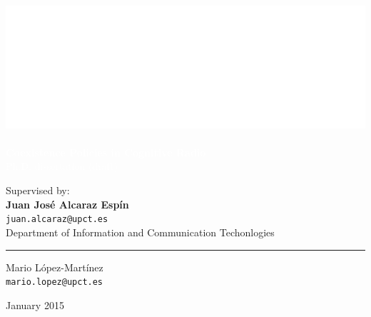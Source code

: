 \graphicspath{ {img/} }

\makeatletter                   
\def\printauthor{%
    {\large \@author}}          
\makeatother

\author{%

    }
\begin{titlingpage}
\BgThispage
{}
\vspace*{0.25\textheight}
\noindent
\includegraphics{logo.eps}\\\\ 
\textcolor{white}{\Huge\textbf{{Coexistence Policies in Cognitive Radio}}}\vspace*{0.25cm}\\
\noindent
\hspace*{1cm}\textcolor{white}{\normalsize{Ph.D. dissertation (draft)}}
\vspace*{3cm}\par
\noindent
\hspace*{3.5cm}
\begin{minipage}{0.35\linewidth}
    \begin{flushright}
    Supervised by: \\
    \textbf{Juan Jos\'e Alcaraz Esp\'in}\\
    \texttt{juan.alcaraz@upct.es}
    \vspace*{1cm}\\
    Department of Information and Communication Techonlogies\\
    \end{flushright}
\end{minipage} \hspace{15pt}
%
\begin{minipage}{0.02\linewidth}
    \rule{1pt}{175pt}
\end{minipage} \hspace{0pt}
%
\begin{minipage}{0.63\linewidth}
\vspace{8pt}
    \Large{Mario L\'{o}pez-Mart\'{i}nez} \\
    \large\texttt{mario.lopez@upct.es} \\
\end{minipage}
\vfill
\hspace{0.5\linewidth}January 2015
\end{titlingpage}
\restoregeometry